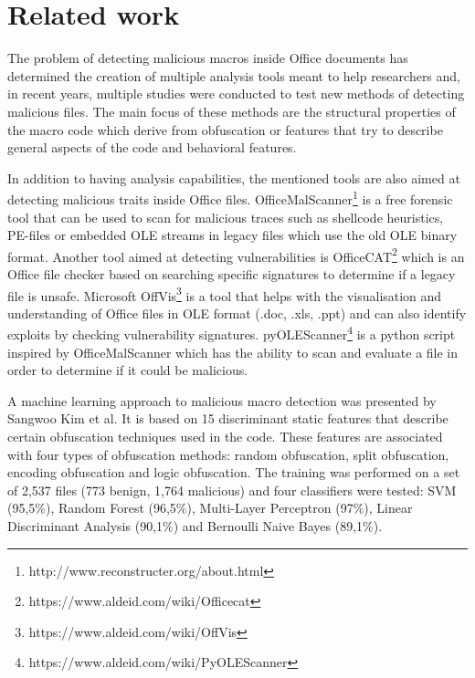 \section{Related work}
The problem of detecting malicious macros inside Office documents has determined the creation of multiple analysis tools meant to help researchers and, in recent years, multiple studies were conducted to test new methods of detecting malicious files. The main focus of these methods are the structural properties of the macro code which derive from obfuscation or features that try to describe general aspects of the code and behavioral features. 
\par
In addition to having analysis capabilities, the mentioned tools are also aimed at detecting malicious traits inside Office files. OfficeMalScanner\footnote{http://www.reconstructer.org/about.html} is a free forensic tool that can be used to scan for malicious traces such as shellcode heuristics, PE-files or embedded OLE streams in legacy files which use the old OLE binary format. Another tool aimed at detecting vulnerabilities is OfficeCAT\footnote{https://www.aldeid.com/wiki/Officecat} which is an Office file checker based on searching specific signatures to determine if a legacy file is unsafe. Microsoft OffVis\footnote{https://www.aldeid.com/wiki/OffVis} is a tool that helps with the visualisation and understanding of Office files in OLE format (.doc, .xls, .ppt) and can also identify exploits by checking vulnerability signatures. pyOLEScanner\footnote{https://www.aldeid.com/wiki/PyOLEScanner} is a python script inspired by OfficeMalScanner which has the ability to scan and evaluate a file in order to determine if it could be malicious.
\par
A machine learning approach to malicious macro detection was presented by Sangwoo Kim et al. \cite{kimhongohlee2018} It is based on 15 discriminant static features that describe certain obfuscation techniques used in the code. These features are associated with four types of obfuscation methods: random obfuscation, split obfuscation, encoding obfuscation and logic obfuscation. The training was performed on a set of 2,537 files (773 benign, 1,764 malicious) and four classifiers were tested: SVM (95,5\%), Random Forest (96,5\%), Multi-Layer Perceptron (97\%), Linear Discriminant Analysis (90,1\%) and Bernoulli Naive Bayes (89,1\%). 
\par
